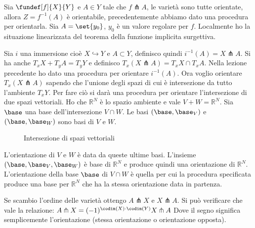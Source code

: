 

Sia $\fundef[f]{X}{Y}$ e $A \in Y$ tale che $f \pitchfork A$, le varietà sono tutte orientate, allora $Z = f^{-1}(A)$ è orientabile, precedentemente abbiamo dato una procedura per orientarla.
Sia $A = \set{y_0}$, $y_0$ è un valore regolare per $f$. Localmente ho la situazione linearizzata del teorema della funzione implicita surgettiva.



Sia $i$ una immersione cioè $X \hookrightarrow Y$ e $A \subset Y$, definisco quindi $i^{-1} (A) = X \pitchfork A$. Si ha anche $T_{x}X + T_{y}A = T_{y}Y$ e definisco $T_{x}(X \pitchfork A) = T_{x}X \cap T_{x}A$.
Nella lezione precedente ho dato una procedura per orientare $i^{-1} (A)$. Ora voglio orientare  $T_{x}(X \pitchfork A)$ sapendo che l'unione degli spazi di cui è intersezione da tutto l'ambiente $T_{x}Y$. Per fare ciò si darà una procedura per orientare l'intersezione di due spazi vettoriali.
Ho che $\mathbb{R}^{N}$ è lo spazio ambiente e vale $V+W = \mathbb{R}^{N}$. Sia $\base$ una base dell'intersezione $V \cap W $. Le basi $(\base, \base_{V})$ e  $(\base, \base_{W})$ sono basi di $V$ e $W$.

\begin{figure}
    \centering %
    
    \caption{Intersezione di spazi vettoriali}
\end{figure}

L'orientazione di $V$ e $W$ è data da queste ultime basi. L'insieme $(\base, \base_V, \base_W)$ è base di $\mathbb{R}^{N}$ e produce quindi una orientazione di $\mathbb{R}^{N}$.
L'orientazione della base $\base$ di $V \cap W$ è quella per cui la procedura specificata produce una base per $\mathbb{R}^{N}$ che ha la stessa orientazione data in partenza.


\begin{oss}
 Se scambio l'ordine delle varietà ottengo $A \pitchfork X$ e $X \pitchfork A$. Si può verificare che vale la relazione: $ A \pitchfork X = (-1)^{\codim(X) \cdot \codim(Y)} X \pitchfork A$
 Dove il segno significa semplicemente l'orientazione (stessa orientazione o orientazione opposta).
\end{oss}

